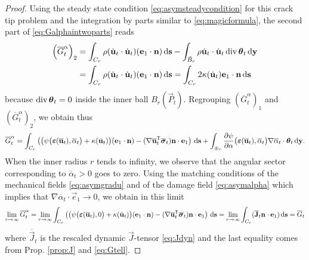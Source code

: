 \begin{proof}
Using the steady state condition \eqref{eq:asymsteadycondition} for this crack tip problem and the integration by parts similar to \eqref{eq:magicformula}, the second part of \eqref{eq:Galphaintwoparts} reads
\begin{align*}
\left(\overline{G}^\alpha_t\right)_2 &= \int_{C_r}\rho(\dot{\vec{u}}_t\cdot\dot{\vec{u}}_t)(\vec{e}_1\cdot\vec{n})\D{\vec{s}}-\int_{\tilde{B}_r}\rho\dot{\vec{u}}_t\cdot\dot{\vec{u}}_t\div\vtheta_t\D{\vec{y}} \\
&= \int_{C_r}\rho(\dot{\vec{u}}_t\cdot\dot{\vec{u}}_t)(\vec{e}_1\cdot\vec{n})\D{\vec{s}}=\int_{C_r}2\kappa(\dot{\vec{u}}_t)\vec{e}_1\cdot\vec{n}\D{\vec{s}}
\end{align*}
because $\div\vtheta_t=0$ inside the inner ball $B_r(\vec{P}_t)$. Regrouping $\left(\overline{G}^\alpha_t\right)_1$ and $\left(\overline{G}^\alpha_t\right)_2$, we obtain thus
\[
\overline{G}^\alpha_t=\int_{C_r}\left(\bigl(\psi\bigl(\eps(\overline{\vec{u}}_t),\overline{\alpha}_t\bigr)+\kappa(\dot{\vec{u}}_t)\bigr)(\vec{e}_1\cdot\vec{n})-(\nabla\overline{\vec{u}}_t^\mT\overline{\sig}_t)\vec{n}\cdot\vec{e}_1\right)\D{\vec{s}}+\int_{\circledcirc_r}\frac{\partial\psi}{\partial\alpha}\bigl(\eps(\overline{\vec{u}}_t),\overline{\alpha}_t\bigr)\nabla\overline{\alpha}_t\cdot\vtheta_t\D{\vec{y}}.
\]
When the inner radius $r$ tends to infinity, we observe that the angular sector corresponding to $\overline{\alpha}_t>0$ goes to zero. Using the matching conditions of the mechanical fields \eqref{eq:asymgradu} and of the damage field \eqref{eq:asymalpha} which implies that $\nabla\overline{\alpha}_t\cdot\vec{e}_1\to 0$, we obtain in this limit
\[
\lim_{r\to\infty}\overline{G}^\alpha_t=\lim_{r\to\infty}\int_{C_r}\left(\bigl(\psi\bigl(\eps(\overline{\vec{u}}_t),0\bigr)+\kappa(\dot{\vec{u}}_t)\bigr)(\vec{e}_1\cdot\vec{n})-(\nabla\overline{\vec{u}}_t^\mT\overline{\sig}_t)\vec{n}\cdot\vec{e}_1\right)\D{\vec{s}}=\lim_{r\to\infty}\int_{C_r}(\overline{\vec{J}}_t\vec{n}\cdot\vec{e}_1)\D{\vec{s}}=\overline{G}_t
\]
where $\overline{\vec{J}}_t$ is the rescaled dynamic $\vec{J}$-tensor \eqref{eq:Jdyn} and the last equality comes from Prop. \ref{prop:J} and \eqref{eq:Gtell}.
\end{proof}

